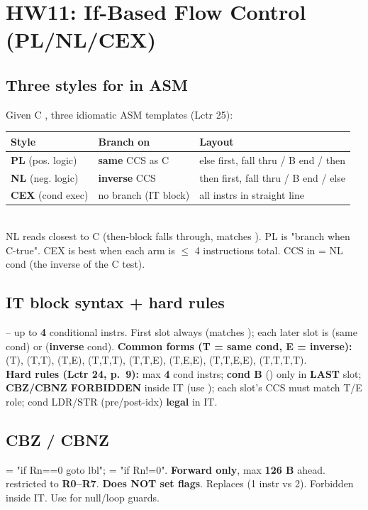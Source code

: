 \section{HW11: If-Based Flow Control (PL/NL/CEX)}

\subsection{Three styles for  in ASM}
Given C , three idiomatic ASM templates (Lctr 25):
\begin{tabular}{@{}l l p{}@{}}
\toprule
Style & Branch on & Layout \\
\midrule
\textbf{PL} (pos. logic) & \textbf{same} CCS as C & else first, fall thru / B end / then \\
\textbf{NL} (neg. logic) & \textbf{inverse} CCS  & then first, fall thru / B end / else \\
\textbf{CEX} (cond exec) & no branch (IT block)  & all instrs in straight line \\
\bottomrule
\end{tabular}\\
NL reads closest to C (then-block falls through, matches ). PL is "branch when C-true". CEX is best when each arm is $\le$ 4 instructions total. CCS in  = NL cond (the inverse of the C test).

\subsection{IT block syntax + hard rules}
 -- up to \textbf{4} conditional instrs. First slot always  (matches ); each later slot is  (same cond) or  (\textbf{inverse} cond).
\textbf{Common forms (T = same cond, E = inverse):}  (T),  (T,T),  (T,E),  (T,T,T),  (T,T,E),  (T,E,E),  (T,T,E,E),  (T,T,T,T).\\
\textbf{Hard rules (Lctr 24, p.\ 9):} max \textbf{4} cond instrs; \textbf{cond B} () only in \textbf{LAST} slot; \textbf{CBZ/CBNZ FORBIDDEN} inside IT (use ); each slot's CCS must match T/E role; cond LDR/STR (pre/post-idx) \textbf{legal} in IT.

\subsection{CBZ / CBNZ}
 = "if Rn==0 goto lbl";  = "if Rn!=0". \textbf{Forward only}, max \textbf{126 B} ahead.  restricted to \textbf{R0--R7}. \textbf{Does NOT set flags}. Replaces  (1 instr vs 2). Forbidden inside IT. Use for null/loop guards.

